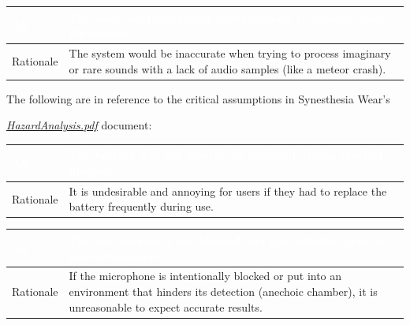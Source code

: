 \documentclass[12pt, titlepage]{article}
\begin{document}
\begin{table}[H]
  \centering
  \begin{tabular}{|p{3cm}|p{11cm}|} 
  \hline
  \rowcolor[rgb]{0.071,0.49,0.698} \textcolor{white}{A2} & \textcolor{white}{The users set their sound configurations to realistic daily-life sounds.}                                    \\ 
  \hline
  \rowcolor[rgb]{0.675,0.827,0.902} Rationale               & The system would be inaccurate when trying to process \quad imaginary or rare sounds with a lack of audio samples (like a meteor crash).\\
  \hline
  \end{tabular}
\end{table}

The following are in reference to the critical assumptions in Synesthesia Wear's

\href{https://github.com/jordanbierbrier/capstone/blob/main/docs/HazardAnalysis/HazardAnalysis.pdf}{\textit{HazardAnalysis.pdf}} document:

\begin{table}[H]
  \centering
  \begin{tabular}{|p{3cm}|p{11cm}|} 
  \hline
  \rowcolor[rgb]{0.071,0.49,0.698} \textcolor{white}{A3} & \textcolor{white}{The battery will not need to be replaced during product \quad lifespan.}                                          \\ 
  \hline
  \rowcolor[rgb]{0.675,0.827,0.902} Rationale               & It is undesirable and annoying for users if they had to replace the battery frequently during use.\\
  \hline
  \end{tabular}
\end{table}

\begin{table}[H]
  \centering
  \begin{tabular}{|p{3cm}|p{11cm}|} 
  \hline
  \rowcolor[rgb]{0.071,0.49,0.698} \textcolor{white}{A4} & \textcolor{white}{The microphone is not blocked and has realistic access to the environment.}                                          \\ 
  \hline
  \rowcolor[rgb]{0.675,0.827,0.902} Rationale               & If the microphone is intentionally blocked or put into an environment that hinders its detection (anechoic chamber), it is unreasonable to expect accurate results.\\
  \hline
  \end{tabular}
\end{table}
\end{document}

